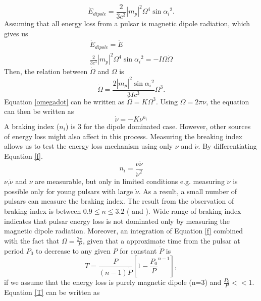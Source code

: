 \documentclass[thesis_msc.tex]{subfiles}
\begin{document}
   \begin{equation} \label{Edotdipole}
   \dot{E}_{dipole}=\frac{2}{3c^3}|m_p|^2\Omega^4 \sin{\alpha_i}^2.
   \end{equation}
   Assuming that all energy loss from a pulsar is magnetic dipole radiation, which gives us 
   \begin{eqnarray} 
   \dot{E}_{dipole}=\dot{E}\\
   \frac{2}{3c^3}|m_p|^2\Omega^4 \sin{\alpha_i}^2=-I\Omega\dot{\Omega}
   \end{eqnarray}
   Then, the relation between $\dot{\Omega}$ and $\Omega$ is
   \begin{equation} \label{omegadot}
   \dot{\Omega}=\frac{2|m_p|^2\sin{\alpha_i}^2}{3Ic^3}\Omega^3.
   \end{equation}
   Equation \ref{omegadot} can be written as $\dot{\Omega}=K\Omega^3$. Using $\Omega=2\pi \nu$, the equation can then be written as 
   \begin{equation} \label{f}
   \dot{\nu}=-K\nu^{n_i}
   \end{equation}
 A braking index ($n_i$) is 3 for the dipole dominated case. However, other sources of energy loss might also affect in this process. Measuring the breaking index allows us to test the energy loss mechanism using only $\nu$ and $\dot{\nu}$. By differentiating Equation \ref{f}.
   \begin{equation} \label{index}
   n_i=\frac{\nu \ddot{\nu}}{\dot{\nu}^2}
   \end{equation}
    $\nu$,$\dot{\nu}$ and $\ddot{\nu}$ are measurable, but only in limited conditions e.g. measuring  $\ddot{\nu}$ is possible only for young pulsars with large $\dot{\nu}$. As a result, a small number of pulsars can measure the braking index. The result from the observation of braking index is between $0.9 \leq n \leq  3.2$ ( \cite{Hamil:2015hqa} and \cite{Archibald:2016hxz}). Wide range of braking index indicates that pulsar energy loss is not dominated only by measuring the magnetic dipole radiation. Moreover, an integration of Equation \ref{f} combined with the fact that $\Omega=\frac{2\pi}{P}$, given that a approximate time from the pulsar at period $P_0$ to decrease to any given $P$ for constant $\dot{P}$ is
    \begin{equation} \label{T}
   T=\frac{P}{(n-1)\dot{P}}[1-\frac{P_0}{P}^{n-1}],
   \end{equation}
   if we assume that the energy loss is purely magnetic dipole (n=3) and $\frac{P_0}{P}<<1$. Equation \ref{T} can be written as  
   
\end{document}
